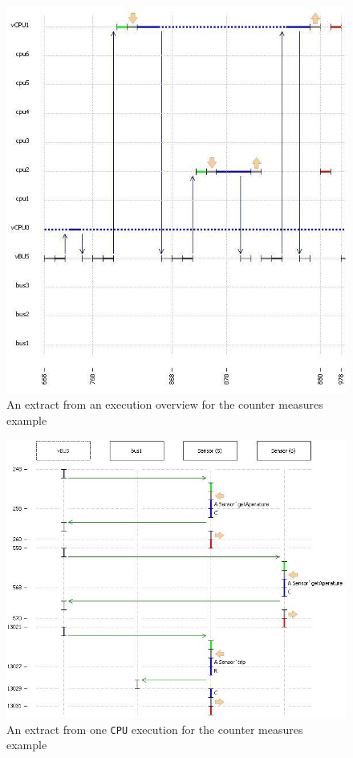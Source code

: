 \documentclass{overturerepchap}
\begin{document}
\begin{figure}
\begin{center}
\includegraphics[width=\textwidth]{figures/exeoverview.png}
\end{center}
\caption{An extract from an execution overview for the counter measures example\label{fig:exeoverview}}
\end{figure}

\begin{figure}
\begin{center}
\includegraphics[width=5.5in]{figures/detailedexe.png}
\end{center}
\caption{An extract from one \texttt{CPU} execution for the counter measures example\label{fig:detailedexe}}
\end{figure}
\end{document}

